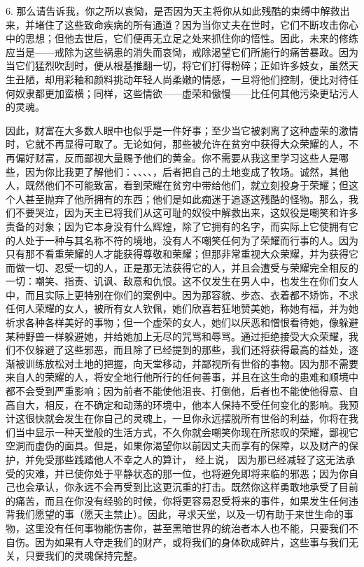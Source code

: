 6. 那么请告诉我，你之所以哀恸，是否因为天主将你从如此残酷的束缚中解救出来，并堵住了这些致命疾病的所有通道？因为当你丈夫在世时，它们不断攻击你心中的思想；但他去世后，它们便再无立足之处来抓住你的悟性。因此，未来的修练应当是——戒除为这些祸患的消失而哀恸，戒除渴望它们所施行的痛苦暴政。因为当它们猛烈吹刮时，便从根基推翻一切，将它们打得粉碎；正如许多妓女，虽然天生丑陋，却用彩釉和颜料挑动年轻人尚柔嫩的情感，一旦将他们控制，便比对待任何奴隶都更加蛮横；同样，这些情欲——虚荣和傲慢——比任何其他污染更玷污人的灵魂。\par

因此，财富在大多数人眼中也似乎是一件好事；至少当它被剥离了这种虚荣的激情时，它就不再显得可取了。无论如何，那些被允许在贫穷中获得大众荣耀的人，不再偏好财富，反而鄙视大量赐予他们的黄金。你不需要从我这里学习这些人是哪些，因为你比我更了解他们：、、、、，后者把自己的土地变成了牧场。诚然，其他人，既然他们不可能致富，看到荣耀在贫穷中带给他们，就立刻投身于荣耀；但这个人甚至抛弃了他所拥有的东西；他们是如此痴迷于追逐这残酷的怪物。那么，我们不要哭泣，因为天主已将我们从这可耻的奴役中解救出来，这奴役是嘲笑和许多责备的对象；因为它本身没有什么辉煌，除了它拥有的名字，而实际上它使拥有它的人处于一种与其名称不符的境地，没有人不嘲笑任何为了荣耀而行事的人。因为只有那不看重荣耀的人才能获得尊敬和荣耀；但那非常重视大众荣耀，并为获得它而做一切、忍受一切的人，正是那无法获得它的人，并且会遭受与荣耀完全相反的一切：嘲笑、指责、讥讽、敌意和仇恨。这不仅发生在男人中，也发生在你们女人中，而且实际上更特别在你们的案例中。因为那容貌、步态、衣着都不矫饰，不求任何人荣耀的女人，被所有女人钦佩，她们欣喜若狂地赞美她，称她有福，并为她祈求各种各样美好的事物；但一个虚荣的女人，她们以厌恶和憎恨看待她，像躲避某种野兽一样躲避她，并给她加上无尽的咒骂和辱骂。通过拒绝接受大众荣耀，我们不仅躲避了这些邪恶，而且除了已经提到的那些，我们还将获得最高的益处，逐渐被训练放松对土地的把握，向天堂移动，并鄙视所有世俗的事物。因为那不需要来自人的荣耀的人，将安全地行他所行的任何善事，并且在这生命的患难和顺境中都不会受到严重影响；因为前者不能使他沮丧、打倒他，后者也不能使他得意、自高自大，相反，在不确定和动荡的环境中，他本人保持不受任何变化的影响。我预计这很快就会发生在你自己的灵魂上，一旦你永远摆脱所有世俗的利益，你将在我们当中显示一种天堂般的生活方式，不久你就会嘲笑你现在所悲叹的荣耀，鄙视它空洞而虚伪的面具。但是，如果你渴望你以前因丈夫而享有的保障，以及财产的保护，并免受那些践踏他人不幸之人的算计， 经上说， 因为那已经减轻了这无法承受的灾难，并已使你处于平静状态的那一位，也将避免即将来临的邪恶；因为你自己也会承认，你永远不会再受到比这更沉重的打击。既然你这样勇敢地承受了目前的痛苦，而且在你没有经验的时候，你将更容易忍受将来的事件，如果发生任何违背我们愿望的事（愿天主禁止）。因此，寻求天堂，以及一切有助于来世生命的事物，这里没有任何事物能伤害你，甚至黑暗世界的统治者本人也不能，只要我们不自伤。因为如果有人夺走我们的财产，或将我们的身体砍成碎片，这些事与我们无关，只要我们的灵魂保持完整。\par

